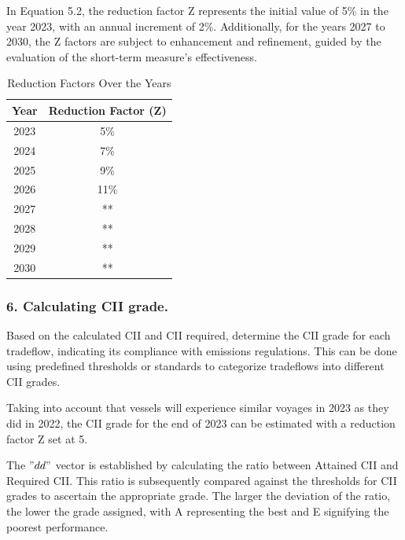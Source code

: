 In Equation 5.2, the reduction factor Z represents the initial value of 5\% in the year 2023,
with an annual increment of 2\%. Additionally, for the years 2027 to 2030,
the Z factors are subject to enhancement and refinement, guided by the evaluation of the short-term measure's effectiveness.

\newpage

\begin{table}[htbp]
    \centering
    \begin{tabular}{cc}
        \toprule
        Year & Reduction Factor (Z) \\
        \midrule
        2023 & 5\%                  \\
        2024 & 7\%                  \\
        2025 & 9\%                  \\
        2026 & 11\%                 \\
        2027 & **                   \\
        2028 & **                   \\
        2029 & **                   \\
        2030 & **                   \\
        \bottomrule
    \end{tabular}
    \caption{Reduction Factors Over the Years}
    \label{tab:reduction-factors}
\end{table}

\subsubsection{6. Calculating CII grade.}

Based on the calculated CII and CII required, determine the CII grade for each tradeflow, indicating its compliance with emissions regulations.
This can be done using predefined thresholds or standards to categorize tradeflows into different CII grades.

Taking into account that vessels will experience similar voyages in 2023 as they did in 2022, the CII grade for the end of 2023 can be estimated with a reduction factor Z set at 5.

The $"dd"$ vector is established by calculating the ratio between Attained CII and Required CII.
This ratio is subsequently compared against the thresholds for CII grades to ascertain the appropriate grade.
The larger the deviation of the ratio, the lower the grade assigned, with A representing the best and E signifying the poorest performance.


